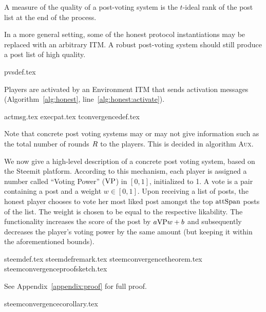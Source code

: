     A measure of the quality of a post-voting system is the $t$-ideal rank of
    the post list at the end of the process.

    In a more general setting, some of the honest protocol instantiations may be
    replaced with an arbitrary ITM. A robust post-voting system should still
    produce a post list of high quality.

    {pvsdef.tex}

    \noindent Players are activated by an Environment ITM that sends activation
    messages (Algorithm~\ref{alg:honest}, line~\ref{alg:honest:activate}).

    {actmsg.tex}
    {execpat.tex}
    {tconvergencedef.tex}

    \noindent Note that concrete post voting systems may or may not give
    information such as the total number of rounds $R$ to the players.
    This is decided in algorithm \textsc{Aux}.

    We now give a high-level description of a concrete post voting system, based
    on the Steemit platform. According to this mechanism, each player is
    assigned a number called ``Voting Power'' ($\mathrm{VP}$) in $\left[0,
    1\right]$, initialized to 1. A vote is a pair containing a post and a weight
    $w \in \left[0, 1\right]$. Upon receiving a list of posts, the honest player
    chooses to vote her most liked post amongst the top $\mathrm{attSpan}$ posts of the
    list. The weight is chosen to be equal to the respective likability. The
    functionality increases the score of the post by $a \mathrm{VP} w + b$ and
    subsequently decreases the player's voting power by the same amount (but
    keeping it within the aforementioned bounds).

    {steemdef.tex}
    {steemdefremark.tex}
    {steemconvergencetheorem.tex}
    {steemconvergenceproofsketch.tex}

    See Appendix~\ref{appendix:proof} for full proof.

    {steemconvergencecorollary.tex}
